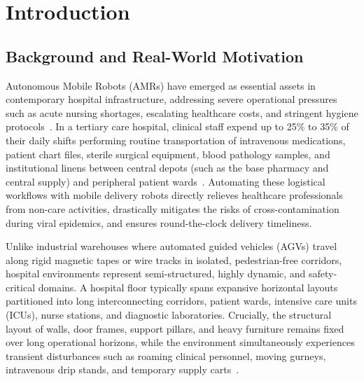 \documentclass[12pt,a4paper]{article}
\begin{document}
\section{Introduction}

\subsection{Background and Real-World Motivation}
Autonomous Mobile Robots (AMRs) have emerged as essential assets in contemporary hospital infrastructure, addressing severe operational pressures such as acute nursing shortages, escalating healthcare costs, and stringent hygiene protocols~\cite{rohde2019}. In a tertiary care hospital, clinical staff expend up to 25\% to 35\% of their daily shifts performing routine transportation of intravenous medications, patient chart files, sterile surgical equipment, blood pathology samples, and institutional linens between central depots (such as the base pharmacy and central supply) and peripheral patient wards~\cite{siciliano2016}. Automating these logistical workflows with mobile delivery robots directly relieves healthcare professionals from non-care activities, drastically mitigates the risks of cross-contamination during viral epidemics, and ensures round-the-clock delivery timeliness.

Unlike industrial warehouses where automated guided vehicles (AGVs) travel along rigid magnetic tapes or wire tracks in isolated, pedestrian-free corridors, hospital environments represent semi-structured, highly dynamic, and safety-critical domains. A hospital floor typically spans expansive horizontal layouts partitioned into long interconnecting corridors, patient wards, intensive care units (ICUs), nurse stations, and diagnostic laboratories. Crucially, the structural layout of walls, door frames, support pillars, and heavy furniture remains fixed over long operational horizons, while the environment simultaneously experiences transient disturbances such as roaming clinical personnel, moving gurneys, intravenous drip stands, and temporary supply carts~\cite{thrun2005}.
\end{document}
